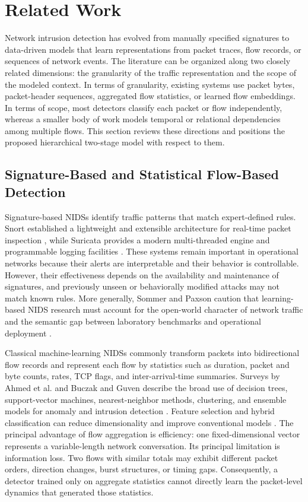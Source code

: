 \documentclass[11pt,fleqn]{report}
\begin{document}
\chapter{Related Work}
\label{sec:related_work}

Network intrusion detection has evolved from manually specified signatures to data-driven models that learn representations from packet traces, flow records, or sequences of network events. The literature can be organized along two closely related dimensions: the granularity of the traffic representation and the scope of the modeled context. In terms of granularity, existing systems use
packet bytes, packet-header sequences, aggregated flow statistics, or learned flow embeddings. In terms of scope, most detectors classify each packet or flow independently, whereas a smaller body of work models temporal or relational dependencies among multiple flows. This section reviews these directions and positions the proposed hierarchical two-stage model with respect to them.

\section{Signature-Based and Statistical Flow-Based Detection}
\label{subsec:rw_signature_flow}

Signature-based NIDSs identify traffic patterns that match expert-defined rules. Snort established a lightweight and extensible architecture for real-time packet inspection \cite{Roesch1999}, while Suricata provides a modern multi-threaded engine and programmable logging facilities \cite{SuricataGuide2026}. These systems remain important in operational networks because their alerts are interpretable and their behavior is controllable. However, their effectiveness depends on the availability and maintenance of signatures, and previously unseen or behaviorally modified
attacks may not match known rules. More generally, Sommer and Paxson caution that learning-based NIDS research must account for the open-world character of network traffic and the semantic gap between laboratory benchmarks and operational deployment \cite{SommerPaxson2010}.

Classical machine-learning NIDSs commonly transform packets into bidirectional flow records and represent each flow by statistics such as duration, packet and byte counts, rates, TCP flags, and inter-arrival-time summaries. Surveys by Ahmed et al. and Buczak and Guven describe the broad use of decision trees, support-vector machines, nearest-neighbor methods, clustering, and ensemble
models for anomaly and intrusion detection \cite{Ahmed2016Survey,BuczakGuven2016}. Feature selection and hybrid classification can reduce dimensionality and improve conventional models
\cite{Aljawarneh2018}. The principal advantage of flow aggregation is efficiency: one fixed-dimensional vector represents a variable-length network conversation. Its principal limitation is information loss. Two flows with similar totals may exhibit different packet orders, direction changes, burst structures, or timing gaps. Consequently, a detector trained only on aggregate
statistics cannot directly learn the packet-level dynamics that generated those statistics.
\end{document}
